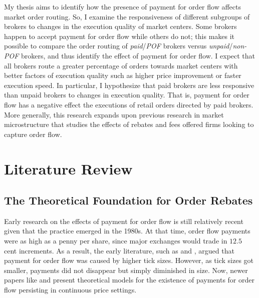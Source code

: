 \documentclass[12pt,a4paper]{extarticle}
\begin{document}
My thesis aims to identify how the presence of payment for order flow affects market order routing. 
So, I examine the responsiveness of different subgroups of brokers to changes in the execution quality of market centers. 
Some brokers happen to accept payment for order flow while others do not; this makes it possible to compare the order routing of \textit{paid}/\textit{POF} brokers versus \textit{unpaid}/\textit{non-POF} brokers, and thus identify the effect of payment for order flow. 
I expect that all brokers route a greater percentage of orders towards market centers with better factors of execution quality such as higher price improvement or faster execution speed. In particular, I hypothesize that paid brokers are less responsive than unpaid brokers to changes in execution quality. That is, payment for order flow has a negative effect the executions of retail orders directed by paid brokers. More generally, this research expands upon previous research in market microstructure that studies the effects of rebates and fees offered firms looking to capture order flow.  



\section{Literature Review}	

\subsection{The Theoretical Foundation for Order Rebates}

Early research on the effects of payment for order flow is still relatively recent given that the practice emerged in the 1980s. At that time, order flow payments were as high as a penny per share, since major exchanges would trade in $12.5$ cent increments. As a result, the early literature, such as \citet{Chordia} and \citet{kandel}, argued that payment for order flow was caused by higher tick sizes. However, as tick sizes got smaller, payments did not disappear but simply diminished in size. Now, newer papers like \citet{parlour} and \citet{BH} present theoretical models for the existence of payments for order flow persisting in continuous price settings. 
\end{document}
